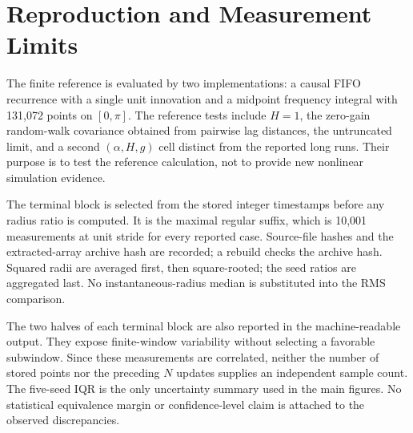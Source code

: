 \section{Reproduction and Measurement Limits}
The finite reference is evaluated by two implementations: a causal FIFO
recurrence with a single unit innovation and a midpoint frequency integral
with 131,072 points on $[0,\pi]$. The reference tests include $H=1$, the
zero-gain random-walk covariance obtained from pairwise lag distances, the
untruncated limit, and a second $(\alpha,H,g)$ cell distinct from the
reported long runs. Their purpose is to test the reference calculation,
not to provide new nonlinear simulation evidence.

The terminal block is selected from the stored integer timestamps before
any radius ratio is computed. It is the maximal regular suffix, which is
10,001 measurements at unit stride for every reported case. Source-file
hashes and the extracted-array archive hash are recorded; a rebuild checks
the archive hash. Squared radii are averaged first, then square-rooted;
the seed ratios are aggregated last. No instantaneous-radius median is
substituted into the RMS comparison.

The two halves of each terminal block are also reported in the
machine-readable output. They expose finite-window variability without
selecting a favorable subwindow. Since these measurements are correlated,
neither the number of stored points nor the preceding $N$ updates supplies
an independent sample count. The five-seed IQR is the only uncertainty
summary used in the main figures. No statistical equivalence margin or
confidence-level claim is attached to the observed discrepancies.
